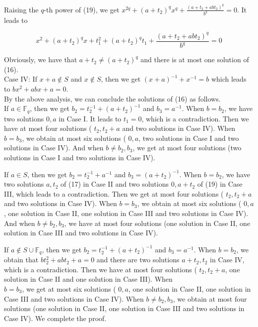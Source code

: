 \documentclass[10pt]{article}
\begin{document}
Raising the $q$-th power of (19), we get $x^{2 q}+\left(a+t_{2}\right)^{q} x^{q}+\frac{\left(a+t_{2}+a b t_{2}\right)^{q}}{b^{q}}=0$. It leads to


\begin{equation*}
x^{2}+\left(a+t_{2}\right)^{q} x+t_{1}^{2}+\left(a+t_{2}\right)^{q} t_{1}+\frac{\left(a+t_{2}+a b t_{2}\right)^{q}}{b^{q}}=0 \tag{20}
\end{equation*}


Obviously, we have that $a+t_{2} \neq\left(a+t_{2}\right)^{q}$ and there is at most one solution of (16).\\
Case IV: If $x+a \notin S$ and $x \notin S$, then we get $(x+a)^{-1}+x^{-1}=b$ which leads to $b x^{2}+a b x+a=0$.\\
By the above analysis, we can conclude the solutions of (16) as follows.\\
If $a \in \mathbb{F}_{q}$, then we get $b_{2}=t_{2}^{-1}+\left(a+t_{2}\right)^{-1}$ and $b_{3}=a^{-1}$. When $b=b_{2}$, we have two solutions $0, a$ in Case I. It leads to $t_{1}=0$, which is a contradiction. Then we have at most four solutions ( $t_{2}, t_{2}+a$ and two solutions in Case IV). When $b=b_{3}$, we obtain at most six solutions ( $0, a$, two solutions in Case I and two solutions in Case IV). And when $b \neq b_{2}, b_{3}$, we get at most four solutions (two solutions in Case I and two solutions in Case IV).

If $a \in S$, then we get $b_{2}=t_{2}^{-1}+a^{-1}$ and $b_{3}=\left(a+t_{2}\right)^{-1}$. When $b=b_{2}$, we have two solutions $a, t_{2}$ of (17) in Case II and two solutions $0, a+t_{2}$ of (19) in Case III, which leads to a contradiction. Then we get at most four solutions ( $t_{2}, t_{2}+a$ and two solutions in Case IV). When $b=b_{3}$, we obtain at most six solutions ( $0, a$, one solution in Case II, one solution in Case III and two solutions in Case IV). And when $b \neq b_{2}, b_{3}$, we have at most four solutions (one solution in Case II, one solution in Case III and two solutions in Case IV).

If $a \notin S \cup \mathbb{F}_{q}$, then we get $b_{2}=t_{2}^{-1}+\left(a+t_{2}\right)^{-1}$ and $b_{3}=a^{-1}$. When $b=b_{2}$, we obtain that $b t_{2}^{2}+a b t_{2}+a=0$ and there are two solutions $a+t_{2}, t_{2}$ in Case IV, which is a contradiction. Then we have at most four solutions ( $t_{2}, t_{2}+a$, one solution in Case II and one solution in Case III). When\\
$b=b_{3}$, we get at most six solutions ( $0, a$, one solution in Case II, one solution in Case III and two solutions in Case IV). When $b \neq b_{2}, b_{3}$, we obtain at most four solutions (one solution in Case II, one solution in Case III and two solutions in Case IV). We complete the proof.
\end{document}
